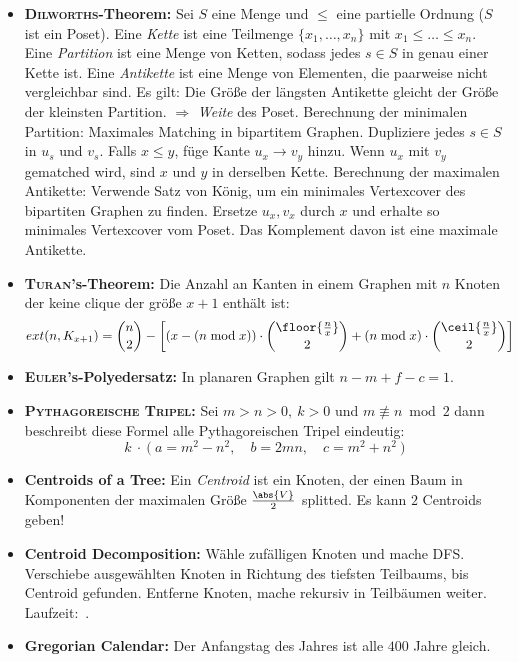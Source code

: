 \begin{itemize}
	\item \textbf{\textsc{Dilworths}-Theorem:}
	Sei $S$ eine Menge und $\leq$ eine partielle Ordnung ($S$ ist ein Poset).
	Eine \emph{Kette} ist eine Teilmenge $\{x_1,\ldots,x_n\}$ mit $x_1 \leq \ldots \leq x_n$.
	Eine \emph{Partition} ist eine Menge von Ketten, sodass jedes $s \in S$ in genau einer Kette ist.
	Eine \emph{Antikette} ist eine Menge von Elementen, die paarweise nicht vergleichbar sind.
	\newline
	Es gilt: Die Größe der längsten Antikette gleicht der Größe der kleinsten Partition.
	$\Rightarrow$ \emph{Weite} des Poset.
	\newline
	Berechnung der minimalen Partition: Maximales Matching in bipartitem Graphen.
	Dupliziere jedes $s \in S$ in $u_s$ und $v_s$.
	Falls $x \leq y$, füge Kante $u_x \to v_y$ hinzu.
	Wenn $u_x$ mit $v_y$ gematched wird, sind $x$ und $y$ in derselben Kette.
	\newline
	Berechnung der maximalen Antikette: Verwende Satz von König, um ein
	minimales Vertexcover des bipartiten Graphen zu finden.
	Ersetze $u_x, v_x$ durch $x$ und erhalte so minimales Vertexcover vom Poset.
	Das Komplement davon ist eine maximale Antikette.
	
	\item \textbf{\textsc{Turan}'s-Theorem:}
	Die Anzahl an Kanten in einem Graphen mit $n$ Knoten der keine clique der größe $x+1$ enthält ist:
	\begin{align*}
	ext(n, K_{x+1}) &= \binom{n}{2} - \left[\left(x - (n \bmod x)\right) \cdot \binom{\floor{\frac{n}{x}}}{2} + \left(n\bmod x\right)  \cdot \binom{\ceil{\frac{n}{x}}}{2}\right]
	\end{align*}
	
	\item \textbf{\textsc{Euler}'s-Polyedersatz:}
	In planaren Graphen gilt $n-m+f-c=1$.
	
	\item \textbf{\textsc{Pythagoreische Tripel}:}
	Sei $m>n>0,~k>0$ und $m\not\equiv n \bmod 2$ dann beschreibt diese Formel alle Pythagoreischen Tripel eindeutig:
	\[k~\cdot~\Big(~a=m^2-n^2,\quad b=2mn,\quad c=m^2+n^2~\Big)\]
	
	\item \textbf{Centroids of a Tree:}
	Ein \emph{Centroid} ist ein Knoten, der einen Baum in Komponenten der maximalen Größe $\frac{\abs{V}}{2}$ splitted.
	Es kann $2$ Centroids geben!
	
	\item \textbf{Centroid Decomposition:}
	Wähle zufälligen Knoten und mache DFS.
	Verschiebe ausgewählten Knoten in Richtung des tiefsten Teilbaums, bis Centroid gefunden. Entferne Knoten, mache rekursiv in Teilbäumen weiter. Laufzeit:~.
	\item \textbf{Gregorian Calendar:} Der Anfangstag des Jahres ist alle $400$ Jahre gleich.


\end{itemize}
